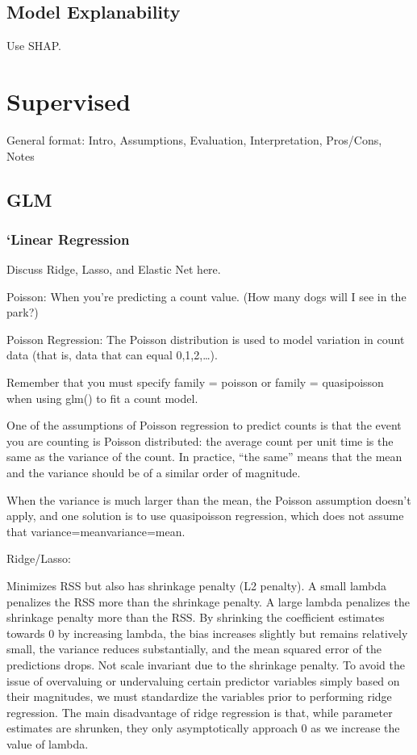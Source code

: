 \documentclass[]{book}
\begin{document}
\subsection{Model Explanability}\label{model-explanability}

Use SHAP.

\section{Supervised}\label{supervised}

General format: Intro, Assumptions, Evaluation, Interpretation,
Pros/Cons, Notes

\subsection{GLM}\label{glm}

\subsubsection{`Linear Regression}\label{linear-regression}

Discuss Ridge, Lasso, and Elastic Net here.

Poisson: When you're predicting a count value. (How many dogs will I see
in the park?)

Poisson Regression: The Poisson distribution is used to model variation
in count data (that is, data that can equal 0,1,2,\ldots{}).

Remember that you must specify family = poisson or family = quasipoisson
when using glm() to fit a count model.

One of the assumptions of Poisson regression to predict counts is that
the event you are counting is Poisson distributed: the average count per
unit time is the same as the variance of the count. In practice, ``the
same'' means that the mean and the variance should be of a similar order
of magnitude.

When the variance is much larger than the mean, the Poisson assumption
doesn't apply, and one solution is to use quasipoisson regression, which
does not assume that variance=meanvariance=mean.

Ridge/Lasso:

Minimizes RSS but also has shrinkage penalty (L2 penalty). A small
lambda penalizes the RSS more than the shrinkage penalty. A large lambda
penalizes the shrinkage penalty more than the RSS. By shrinking the
coefficient estimates towards 0 by increasing lambda, the bias increases
slightly but remains relatively small, the variance reduces
substantially, and the mean squared error of the predictions drops. Not
scale invariant due to the shrinkage penalty. To avoid the issue of
overvaluing or undervaluing certain predictor variables simply based on
their magnitudes, we must standardize the variables prior to performing
ridge regression. The main disadvantage of ridge regression is that,
while parameter estimates are shrunken, they only asymptotically
approach 0 as we increase the value of lambda.
\end{document}
